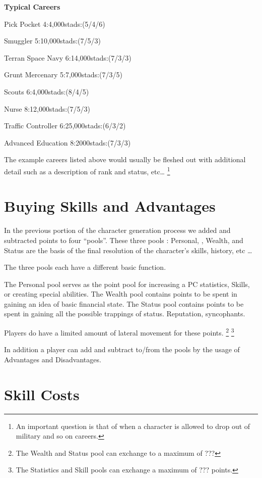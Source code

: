 {\bf Typical Careers}
	\begin{relate}
		\item[Pick Pocket]
        4:4,000stads:(5/4/6)
		\item[Smuggler]
        5:10,000stads:(7/5/3)
		\item[Terran Space Navy]
        6:14,000stads:(7/3/3)
		\item[Grunt Mercenary]
        5:7,000stads:(7/3/5)
		\item[Scouts]
        6:4,000stads:(8/4/5)
		\item[Nurse]
        8:12,000stads:(7/5/3)
		\item[Traffic Controller]
        6:25,000stads:(6/3/2)
		\item[Advanced Education]
        8:2000stads:(7/3/3)
	\end{relate}

The example careers listed above would usually be fleshed out with
additional detail such as a description of rank and status, etc\dots
\footnote{An important question is that of when a character is
allowed to drop out of military and so on careers.}

\section{Buying Skills and Advantages}

In the previous portion of the character generation process we added
and subtracted points to four ``pools''. These three pools : Personal,
, Wealth, and Status are the basis of the final resolution of
the character's skills, history, etc \dots

The three pools each have a different basic function.

The Personal pool serves as the point pool for
increasing a PC statistics, Skills,  or creating special abilities.
The Wealth pool contains points to be spent in gaining an idea of
basic financial state.
The Status pool contains points to be spent in gaining all the
possible trappings of status. Reputation, syncophants.

Players do have a limited amount of lateral movement for these
points. \footnote{The Wealth and Status pool can exchange to a maximum of ???}
\footnote{The Statistics and Skill pools can exchange a maximum of ??? points.}

In addition a player can add and subtract to/from the pools by the
usage of Advantages and Disadvantages.

\section{Skill Costs}

